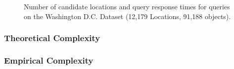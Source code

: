 \small{
\begin{figure}[h]
    \centering
    \begin{subfigure}[t]{.45\textwidth}
        
        
    \end{subfigure}
    \hfill
    \begin{subfigure}[t]{.45\textwidth} 
        
    \end{subfigure}

    \caption{Number of candidate locations and query response times for queries on the Washington D.C. Dataset (12,179 Locations, 91,188 objects).}\label{figure:PerformanceExperiments}\label{fig:queryExecutionRecall}        \label{fig:queryExecutionTime}
\end{figure}
}

\subsubsection{Theoretical Complexity}



\subsubsection{Empirical Complexity}

